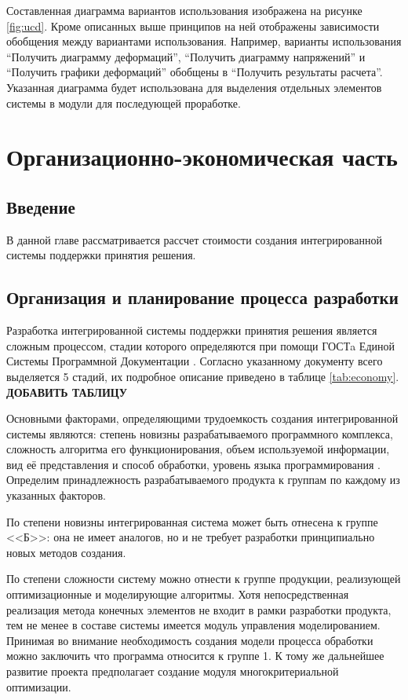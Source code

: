 \documentclass[14pt,oneside,final]{extreport}
\begin{document}
	Составленная диаграмма вариантов использования изображена на рисунке \ref{fig:ucd}. Кроме описанных выше принципов на ней отображены зависимости обобщения между вариантами использования. Например, варианты использования ``Получить диаграмму деформаций'', ``Получить диаграмму напряжений'' и ``Получить графики деформаций'' обобщены в ``Получить результаты расчета''.  Указанная диаграмма будет использована для выделения отдельных элементов системы в модули для последующей проработке. 
	
	\chapter{Организационно-экономическая часть}
	\section{Введение}
	В данной главе рассматривается рассчет стоимости создания интегрированной системы поддержки принятия решения. 


	\section{Организация и планирование процесса разработки}
	Разработка интегрированной системы поддержки принятия решения является сложным процессом, стадии которого определяются при помощи ГОСТa Единой Системы Программной Документации \cite{gost:19102}. Согласно указанному документу всего выделяется 5 стадий, их подробное описание приведено в таблице \ref{tab:economy}. \textbf{{\MakeUppercase{Добавить таблицу}}}
	
	Основными факторами, определяющими трудоемкость создания интегрированной системы являются: степень новизны разрабатываемого программного комплекса, сложность алгоритма его функционирования, объем используемой информации, вид её представления и способ обработки, уровень языка программирования \cite{metoda:Economy}. Определим принадлежность разрабатываемого продукта к группам по каждому из указанных факторов. 
	
	По степени новизны интегрированная система может быть отнесена к группе <<Б>>: она не имеет аналогов, но и не требует разработки принципиально новых методов создания. 
	
	По степени сложности систему можно отнести к группе продукции, реализующей оптимизационные и моделирующие алгоритмы. Хотя непосредственная реализация метода конечных элементов не входит в рамки разработки продукта, тем не менее в составе системы имеется модуль управления моделированием. Принимая во внимание необходимость создания модели процесса обработки можно заключить что программа относится к группе 1. К тому же дальнейшее развитие проекта предполагает создание модуля многокритериальной оптимизации. 
	
\end{document}
